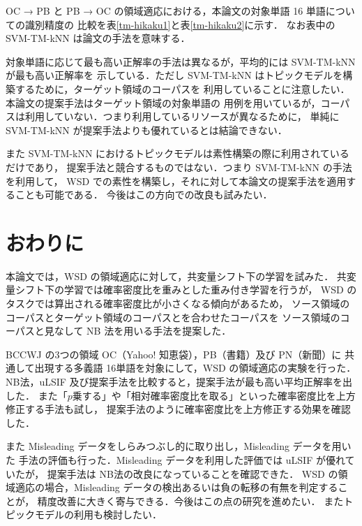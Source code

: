 \documentclass[japanese]{jnlp_1.4}
\begin{document}
OC → PB と PB → OC の領域適応における，本論文の対象単語 16 単語についての識別精度の
比較を\mbox{表\ref{tm-hikaku1}}と\mbox{表\ref{tm-hikaku2}}に示す．
なお表中の SVM-TM-kNN は論文\cite{shinnou-gengo-13}の手法を意味する．

対象単語に応じて最も高い正解率の手法は異なるが，平均的には SVM-TM-kNN が最も高い正解率を
示している．ただし  SVM-TM-kNN はトピックモデルを構築するために，ターゲット領域のコーパスを
利用していることに注意したい．本論文の提案手法はターゲット領域の対象単語の
用例を用いているが，コーパスは利用していない．つまり利用しているリソースが異なるために，
単純に SVM-TM-kNN が提案手法よりも優れているとは結論できない．

また SVM-TM-kNN におけるトピックモデルは素性構築の際に利用されているだけであり，
提案手法と競合するものではない．つまり SVM-TM-kNN の手法を利用して，
WSD での素性を構築し，それに対して本論文の提案手法を適用することも可能である．
今後はこの方向での改良も試みたい．


\section{おわりに}

本論文では，WSD の領域適応に対して，共変量シフト下の学習を試みた．
共変量シフト下の学習では確率密度比を重みとした重み付き学習を行うが，
WSD のタスクでは算出される確率密度比が小さくなる傾向があるため，
ソース領域のコーパスとターゲット領域のコーパスとを合わせたコーパスを
ソース領域のコーパスと見なして NB 法を用いる手法を提案した．

BCCWJ の3つの領域 OC（Yahoo! 知恵袋），PB（書籍）及び PN（新聞）に
共通して出現する多義語 16単語を対象にして，WSD の領域適応の実験を行った．
NB法，uLSIF 及び提案手法を比較すると，提案手法が最も高い平均正解率を出した．
また「$p$乗する」や「相対確率密度比を取る」といった確率密度比を上方修正する手法も試し，
提案手法のように確率密度比を上方修正する効果を確認した．

また Misleading データをしらみつぶし的に取り出し，Misleading データを用いた
手法の評価も行った．Misleading データを利用した評価では uLSIF が優れていたが，
提案手法は NB法の改良になっていることを確認できた．
WSD の領域適応の場合，Misleading データの検出あるいは負の転移の有無を判定することが，
精度改善に大きく寄与できる．今後はこの点の研究を進めたい．
またトピックモデルの利用も検討したい．
\end{document}
